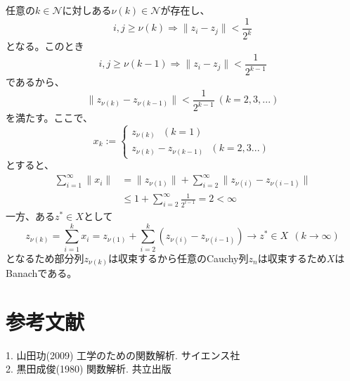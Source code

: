 \documentclass[a4paper,10pt]{jsarticle}
\begin{document}
任意の$k\in\mathcal{N}$に対しある$\nu(k)\in\mathcal{N}$が存在し、
\begin{equation}
 i,j\ge\nu(k)\Rightarrow\|z_i-z_j\|<\frac{1}{2^k}
\end{equation}
となる。このとき
\begin{equation}
 i,j\ge\nu(k-1)\Rightarrow\|z_i-z_j\|<\frac{1}{2^{k-1}}
\end{equation}
であるから、
\begin{equation}
 \|z_{\nu(k)}-z_{\nu(k-1)}\|<\frac{1}{2^{k-1}}~(k=2,3,...)
\end{equation}
を満たす。ここで、
\begin{equation}
 x_k:=\begin{cases}
       z_{\nu(k)} ~~~(k=1) \\
       z_{\nu(k)}-z_{\nu(k-1)}~~~(k=2,3...) 
      \end{cases}
\end{equation}
とすると、
\begin{align}
 \sum_{i=1}^\infty\|x_i\|&=\|z_{\nu(1)}\|+\sum_{i=2}^\infty \|z_{\nu(i)}-z_{\nu(i-1)}\| \\
                         &\le 1+\sum_{i=2}^\infty \frac{1}{2^{i-1}} = 2 < \infty
\end{align}
一方、ある$z^*\in X$として
\begin{equation}
 z_{\nu(k)}=\sum_{i=1}^k x_i=z_{\nu(1)} + \sum_{i=2}^k (z_{\nu(i)}-z_{\nu(i-1)})\to z^*\in X~~(k\to\infty)
\end{equation}
となるため部分列$z_{\nu(k)}$は収束するから任意のCauchy列$z_n$は収束するため$X$はBanachである。

\section{参考文献}

1. 山田功(2009) 工学のための関数解析. サイエンス社\\

2. 黒田成俊(1980) 関数解析. 共立出版\\
\end{document}
